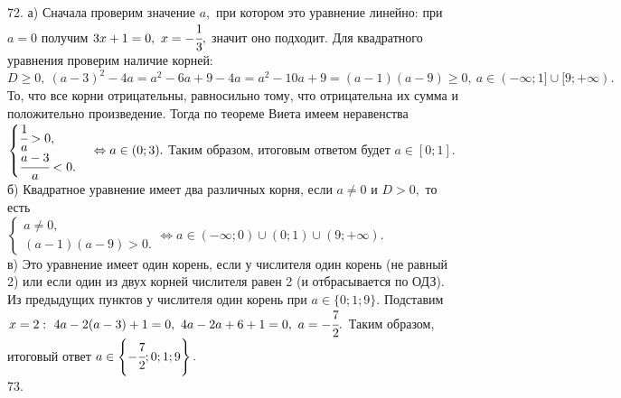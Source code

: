 \documentclass[12pt]{article}
\begin{document}
72. а) Сначала проверим значение $a,$ при котором это уравнение линейно: при $a=0$ получим $3x+1=0,\ x=-\cfrac{1}{3},$ значит оно подходит. Для квадратного уравнения проверим наличие корней: $D\geqslant0,\ (a-3)^2-4a=a^2-6a+9-4a=a^2-10a+9=(a-1)(a-9)\geqslant0,\ a\in(-\infty;1]\cup[9;+\infty).$ То, что все корни отрицательны, равносильно тому, что отрицательна их сумма и положительно произведение. Тогда по теореме Виета имеем неравенства $\begin{cases} \cfrac{1}{a}>0,\\ \cfrac{a-3}{a}<0.\end{cases} \Leftrightarrow a\in (0;3).$ Таким образом, итоговым ответом будет $a\in[0;1].$\\
б) Квадратное уравнение имеет два различных корня, если $a\neq0$ и $D>0,$ то есть \\$\begin{cases}a\neq0,\\ (a-1)(a-9)>0.\end{cases}\Leftrightarrow a\in(-\infty;0)\cup(0;1)\cup(9;+\infty).$\\
в) Это уравнение имеет один корень, если у числителя один корень (не равный 2) или если один из двух корней числителя равен 2 (и отбрасывается по ОДЗ). Из предыдущих пунктов у числителя один корень при $a\in\{0; 1; 9\}.$ Подставим $x=2:\ 4a-2(a-3)+1=0,\ 4a-2a+6+1=0,\ a=-\cfrac{7}{2}.$ Таким образом, итоговый ответ $a\in \left\{-\cfrac{7}{2};0; 1; 9\right\}.$\\
73. \begin{figure}[ht!]
\end{figure}\\
\end{document}
